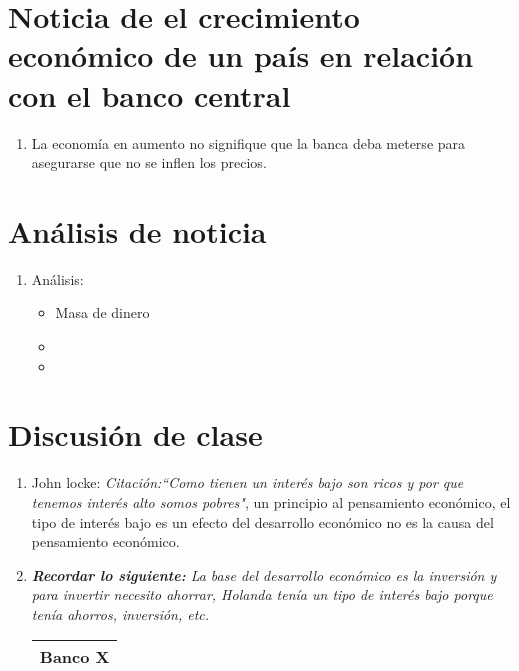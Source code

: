 \section{Noticia de el crecimiento económico de un país en relación con el banco central}
\begin{enumerate}
    \item La economía en aumento no signifique que la banca deba meterse para asegurarse que no se inflen los precios.  
\end{enumerate} %


\section{Análisis de noticia}
\begin{enumerate}
    \item Análisis:
        \begin{itemize}
            \item Masa de dinero %
            \item  %
            \item  %
        \end{itemize}
\end{enumerate}

\section{Discusión de clase}
\begin{enumerate}
    \item John locke: \emph{Citación:``Como tienen un interés bajo son ricos y por que tenemos interés alto somos pobres"}, un principio al pensamiento económico, el tipo de interés bajo es un efecto del desarrollo económico no es la causa del pensamiento económico.
    \item \emph{\textbf{Recordar lo siguiente: }La base del desarrollo económico es la inversión y para invertir necesito ahorrar, Holanda tenía un tipo de interés bajo porque tenía ahorros, inversión, etc.}
        \begin{center}
        \begin{tabular}{ | p{5cm} | p{5cm} | }
         \hline
        \multicolumn{2}{|c|}{Banco X} \\
        \hline  
        
         \hline
        \end{tabular}
        \end{center}
\end{enumerate}
